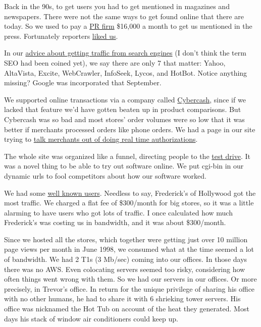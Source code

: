 Back in the 90s, to get users you had to get mentioned in magazines and
newspapers. There were not the same ways to get found online that there
are today. So we used to pay a \href{submarine.html}{PR firm} \$16,000 a
month to get us mentioned in the press. Fortunately reporters
\href{http://ycombinator.com/viaweb/presquot.html}{liked us}.

In our \href{http://ycombinator.com/viaweb/se.html}{advice about getting
traffic from search engines} (I don't think the term SEO had been coined
yet), we say there are only 7 that matter: Yahoo, AltaVista, Excite,
WebCrawler, InfoSeek, Lycos, and HotBot. Notice anything missing? Google
was incorporated that September.

We supported online transactions via a company called
\href{http://en.wikipedia.org/wiki/CyberCash,_Inc.}{Cybercash}, since if
we lacked that feature we'd have gotten beaten up in product
comparisons. But Cybercash was so bad and most stores' order volumes
were so low that it was better if merchants processed orders like phone
orders. We had a page in our site trying to
\href{http://www.ycombinator.com/viaweb/cybercash.html}{talk merchants
out of doing real time authorizations}.

The whole site was organized like a funnel, directing people to the
\href{http://ycombinator.com/viaweb/tesdriv.html}{test drive}. It was a
novel thing to be able to try out software online. We put cgi-bin in our
dynamic urls to fool competitors about how our software worked.

We had some \href{http://ycombinator.com/viaweb/us.html}{well known
users}. Needless to say, Frederick's of Hollywood got the most traffic.
We charged a flat fee of \$300/month for big stores, so it was a little
alarming to have users who got lots of traffic. I once calculated how
much Frederick's was costing us in bandwidth, and it was about
\$300/month.

Since we hosted all the stores, which together were getting just over 10
million page views per month in June 1998, we consumed what at the time
seemed a lot of bandwidth. We had 2 T1s (3 Mb/sec) coming into our
offices. In those days there was no AWS. Even colocating servers seemed
too risky, considering how often things went wrong with them. So we had
our servers in our offices. Or more precisely, in Trevor's office. In
return for the unique privilege of sharing his office with no other
humans, he had to share it with 6 shrieking tower servers. His office
was nicknamed the Hot Tub on account of the heat they generated. Most
days his stack of window air conditioners could keep up.

